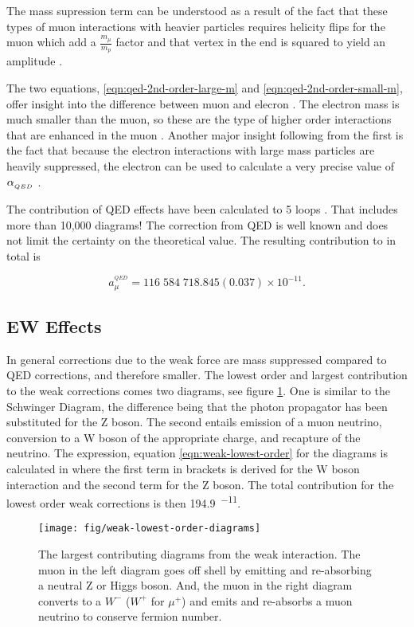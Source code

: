 \noindent
The mass supression term can be understood as a result of the fact that these types of muon interactions with heavier particles requires helicity flips for the muon which add a $\frac{m_\mu}{m_p}$ factor and that vertex in the end is squared to yield an amplitude \cite{amm-of-muon}.

The two equations, \ref{eqn:qed-2nd-order-large-m} and \ref{eqn:qed-2nd-order-small-m}, offer insight into the difference between muon and elecron \gmtwo.  The electron mass is much smaller than the muon, so these are the type of higher order interactions that are enhanced in the muon \gmtwo.  Another major insight following from the first is the fact that because the electron interactions with large mass particles are heavily suppressed, the electron \gmtwo can be used to calculate a very precise value of $\alpha_{_{QED}}$ \cite{g-e-measurement}.

The contribution of QED effects have been calculated to 5 loops \cite{5-loop-qed}.  That includes more than 10,000 diagrams!  The correction from QED is well known and does not limit the certainty on the theoretical value.  The resulting contribution to \mugmtwo in total is

\begin{equation}
\label{eqn:qed-total}
a_\mu^{^{QED}} = 116\;584\;718.845(0.037) \times 10^{-11}.
\end{equation}

\subsection{EW Effects} \label{s-sec:theory-ew}

In general corrections due to the weak force are mass suppressed compared to QED corrections, and therefore smaller.  The lowest order and largest contribution to the weak corrections comes two diagrams, see figure \ref{fig:weak-lowest-order-diagrams}. One is similar to the Schwinger Diagram, the difference being that the photon propagator has been substituted for the Z boson.  The second entails emission of a muon neutrino, conversion to a W boson of the appropriate charge, and recapture of the neutrino.  The expression, equation \ref{eqn:weak-lowest-order} for the diagrams is calculated in \cite{the-muon-g-2} where the first term in brackets is derived for the W boson interaction and the second term for the Z boson.  The total contribution for the lowest order weak corrections is then \SI{194.9}{^{-11}}.

\begin{figure}
\centering
\texttt{[image: fig/weak-lowest-order-diagrams]}
\caption{The largest contributing diagrams from the weak interaction.  The muon in the left diagram goes off shell by emitting and re-absorbing a neutral Z or Higgs boson.  And, the muon in the right diagram converts to a $W^{-}$ ($W^{+}$ for $\mu^{+}$) and emits and re-absorbs a muon neutrino to conserve fermion number. \label{fig:weak-lowest-order-diagrams}}
\end{figure}

